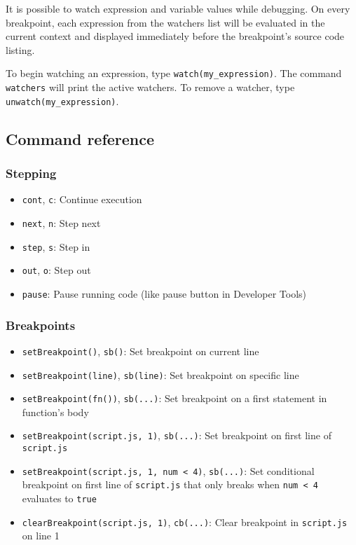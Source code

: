 It is possible to watch expression and variable values while debugging.
On every breakpoint, each expression from the watchers list will be
evaluated in the current context and displayed immediately before the
breakpoint's source code listing.

To begin watching an expression, type
\texttt{watch(\textquotesingle{}my\_expression\textquotesingle{})}. The
command \texttt{watchers} will print the active watchers. To remove a
watcher, type
\texttt{unwatch(\textquotesingle{}my\_expression\textquotesingle{})}.

\subsection{Command reference}\label{command-reference}

\subsubsection{Stepping}\label{stepping}

\begin{itemize}
\tightlist
\item
  \texttt{cont}, \texttt{c}: Continue execution
\item
  \texttt{next}, \texttt{n}: Step next
\item
  \texttt{step}, \texttt{s}: Step in
\item
  \texttt{out}, \texttt{o}: Step out
\item
  \texttt{pause}: Pause running code (like pause button in Developer
  Tools)
\end{itemize}

\subsubsection{Breakpoints}\label{breakpoints}

\begin{itemize}
\tightlist
\item
  \texttt{setBreakpoint()}, \texttt{sb()}: Set breakpoint on current
  line
\item
  \texttt{setBreakpoint(line)}, \texttt{sb(line)}: Set breakpoint on
  specific line
\item
  \texttt{setBreakpoint(\textquotesingle{}fn()\textquotesingle{})},
  \texttt{sb(...)}: Set breakpoint on a first statement in function's
  body
\item
  \texttt{setBreakpoint(\textquotesingle{}script.js\textquotesingle{},\ 1)},
  \texttt{sb(...)}: Set breakpoint on first line of \texttt{script.js}
\item
  \texttt{setBreakpoint(\textquotesingle{}script.js\textquotesingle{},\ 1,\ \textquotesingle{}num\ \textless{}\ 4\textquotesingle{})},
  \texttt{sb(...)}: Set conditional breakpoint on first line of
  \texttt{script.js} that only breaks when \texttt{num\ \textless{}\ 4}
  evaluates to \texttt{true}
\item
  \texttt{clearBreakpoint(\textquotesingle{}script.js\textquotesingle{},\ 1)},
  \texttt{cb(...)}: Clear breakpoint in \texttt{script.js} on line 1
\end{itemize}

